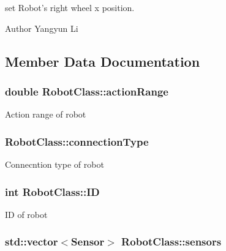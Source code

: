 set Robot's right wheel x position. 

\begin{DoxyAuthor}{Author}
Yangyun Li 
\end{DoxyAuthor}


\subsection{Member Data Documentation}
\hypertarget{classRobotClass_a009553675263e4e281305051f9afc2ba}{
\subsubsection[{action\-Range}]{\setlength{\rightskip}{0pt plus 5cm}double Robot\-Class\-::action\-Range\hspace{0.3cm}{\ttfamily [private]}}}\label{classRobotClass_a009553675263e4e281305051f9afc2ba}
Action range of robot \hypertarget{classRobotClass_a073b0cd68ebfd906f9dc42029e04d1fe}{
\subsubsection[{connection\-Type}]{ Robot\-Class\-::connection\-Type\hspace{0.3cm}{\ttfamily [private]}}}\label{classRobotClass_a073b0cd68ebfd906f9dc42029e04d1fe}
Connecntion type of robot \hypertarget{classRobotClass_afccead30da94de14c11e2305c33991f2}{
\subsubsection[{I\-D}]{\setlength{\rightskip}{0pt plus 5cm}int Robot\-Class\-::\-I\-D\hspace{0.3cm}{\ttfamily [private]}}}\label{classRobotClass_afccead30da94de14c11e2305c33991f2}
I\-D of robot \hypertarget{classRobotClass_ab9fae941de661646a5dbc9758e86306d}{
\subsubsection[{sensors}]{\setlength{\rightskip}{0pt plus 5cm}std\-::vector$<${\bf Sensor}$>$ Robot\-Class\-::sensors\hspace{0.3cm}{\ttfamily [private]}}}\label{classRobotClass_ab9fae941de661646a5dbc9758e86306d}
